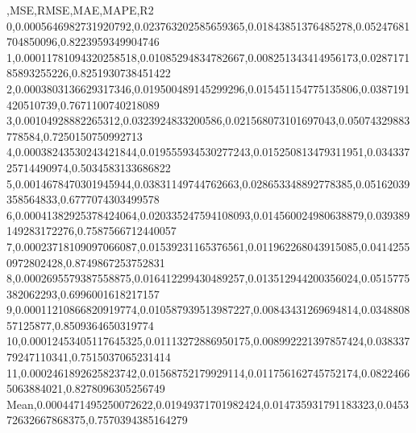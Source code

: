 ,MSE,RMSE,MAE,MAPE,R2
0,0.0005646982731920792,0.023763202585659365,0.01843851376485278,0.05247681704850096,0.8223959349904746
1,0.00011781094320258518,0.01085294834782667,0.008251343414956173,0.028717185893255226,0.8251930738451422
2,0.0003803136629317346,0.019500489145299296,0.015451154775135806,0.0387191420510739,0.7671100740218089
3,0.00104928882265312,0.0323924833200586,0.021568073101697043,0.05074329883778584,0.7250150750992713
4,0.00038243530243421844,0.019555934530277243,0.015250813479311951,0.03433725714490974,0.5034583133686822
5,0.0014678470301945944,0.03831149744762663,0.028653348892778385,0.05162039358564833,0.6777074303499578
6,0.00041382925378424064,0.020335247594108093,0.014560024980638879,0.039389149283172276,0.7587566712440057
7,0.00023718109097066087,0.01539231165376561,0.011962268043915085,0.04142550972802428,0.8749867253752831
8,0.0002695579387558875,0.016412299430489257,0.013512944200356024,0.0515775382062293,0.6996001618217157
9,0.00011210866820919774,0.010587939513987227,0.00843431269694814,0.034880857125877,0.8509364650319774
10,0.00012453405117645325,0.01113272886950175,0.008992221397857424,0.03833779247110341,0.7515037065231414
11,0.0002461892625823742,0.01568752179929114,0.011756162745752174,0.08224665063884021,0.8278096305256749
Mean,0.0004471495250072622,0.01949371701982424,0.014735931791183323,0.045372632667868375,0.7570394385164279
